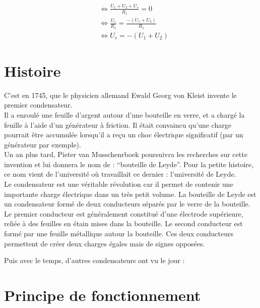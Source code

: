 \begin{align}
&\Leftrightarrow \frac{U_1+U_2+U_s}{R_1}=0 \\
&\Leftrightarrow \frac{U_s}{R_1} = \frac{-(U_1+U_2)}{R_1} \\
&\Leftrightarrow U_s = -(U_1+U_2)
\end{align}%


\chapter{Histoire} 

C’est en 1745, que le physicien allemand Ewald Georg von Kleist invente le premier condensateur. \\
Il a enroulé une feuille d'argent autour d'une bouteille en verre,  et  a  chargé  la  feuille  à  l'aide  d'un  générateur  à  
friction. Il était convaincu  qu'une  charge  pourrait  être  accumulée  lorsqu'il  a  reçu  un  choc  électrique  significatif 
(par un générateur par exemple). \\

Un an plus tard, Pieter van Musschenrboek poursuivra les recherches sur cette invention et lui donnera le nom de : 
“bouteille de Leyde”. Pour la petite histoire, ce nom vient de l’université où travaillait ce dernier : l’université de Leyde. \\
Le condensateur est une véritable révolution car il permet de contenir une importante charge électrique dans un très petit volume.  
La bouteille de Leyde est un condensateur formé de deux conducteurs séparés par le verre de la bouteille.\\

Le premier conducteur est généralement constitué d'une électrode supérieure, reliée à des feuilles en étain mises dans  la  bouteille. 
 Le  second  conducteur  est  formé  par  une feuille  métallique  autour la  bouteille. Ces deux conducteurs permettent de 
 créer deux charges égales mais de signes opposées. \\



Puis avec le temps, d'autres condensateurs ont vu le jour : 

\chapter{Principe de fonctionnement}


